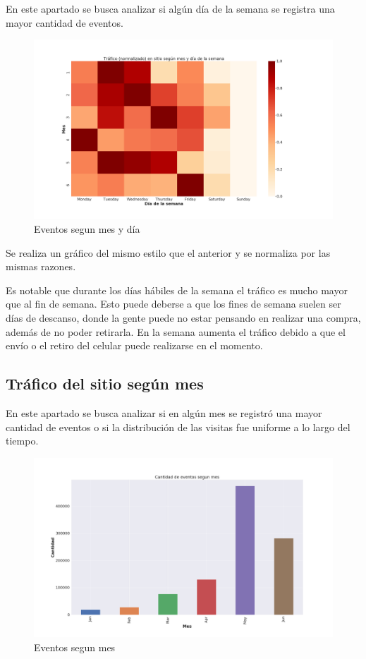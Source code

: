 \documentclass[a4paper]{article}
\begin{document}
En este apartado se busca analizar si algún día de la semana se registra una mayor cantidad de eventos. 

\begin{figure}[h!]
	\includegraphics[width=\linewidth]{figures/031-eventos_segun_dow-heatmap.png}
	\caption{Eventos segun mes y día}
	\label{fig:messemanasnormalizado}
\end{figure}

Se realiza un gráfico del mismo estilo que el anterior y se normaliza por las mismas razones.

Es notable que durante los días hábiles de la semana el tráfico es mucho mayor que al fin de semana. Esto puede deberse a que los fines de semana suelen ser días de descanso, donde la gente puede no estar pensando en realizar una compra, además de no poder retirarla. En la semana aumenta el tráfico debido a que el envío o el retiro del celular puede realizarse en el momento.

\subsection{Tráfico del sitio según mes}

En este apartado se busca analizar si en algún mes se registró una mayor cantidad de eventos o si la distribución de las visitas fue uniforme a lo largo del tiempo.

\begin{figure}[h!]
	\includegraphics[width=\linewidth]{figures/032-eventos_segun_mes-barplot.png}
	\caption{Eventos segun mes}
	\label{fig:mes}
\end{figure}
\end{document}

